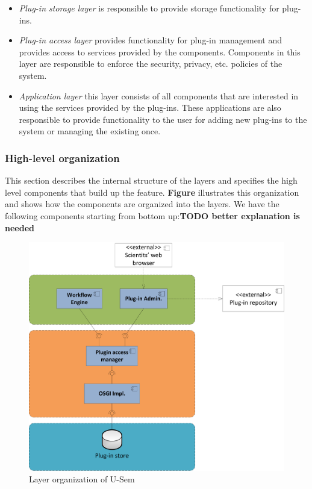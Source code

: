 \begin{itemize}
	\item \textit{Plug-in storage layer} is responsible to provide storage functionality for plug-ins.
	\item \textit{Plug-in access layer} provides functionality for plug-in management and provides access to services provided by the components. Components in this layer are responsible to enforce the security, privacy, etc. policies of the system.
	\item \textit{Application layer} this layer consists of all components that are interested in using the services provided by the plug-ins. These applications are also responsible to provide functionality to the user for adding new plug-ins to the system or managing the existing once. 
	\end{itemize}

\subsubsection{High-level organization}

This section describes the internal structure of the layers and specifies the high level components that build up the feature. \textbf{Figure} illustrates this organization and shows how the components are organized into the layers. We have the following components starting from bottom up:\textbf{TODO better explanation is needed}

\begin{figure}[h!]
  \centering
  	\includegraphics[scale=0.6]{plug-in/layers/main-func.png}
  \caption{Layer organization of U-Sem}
\end{figure}

